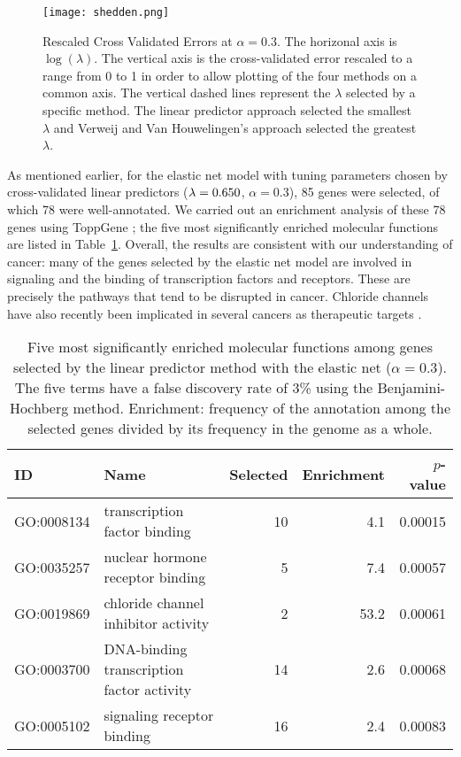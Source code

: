 \begin{figure}[!htb]
  \centering
  \texttt{[image: shedden.png]}
  \caption{\label{fig:CVE}Rescaled Cross Validated Errors at $\alpha = 0.3$. The horizonal axis is $\log(\lambda)$. The vertical axis is the cross-validated error rescaled to a range from 0 to 1 in order to allow plotting of the four methods on a common axis. The vertical dashed lines represent the $\lambda$ selected by a specific method. The linear predictor approach selected the smallest $\lambda$ and Verweij and Van Houwelingen's approach selected the greatest $\lambda$.}
\end{figure}

As mentioned earlier, for the elastic net model with tuning parameters chosen by cross-validated linear predictors ($\lambda = 0.650$, $\alpha = 0.3$), 85 genes were selected, of which 78 were well-annotated.  We carried out an enrichment analysis of these 78 genes using ToppGene \citep{Chen2009c}; the five most significantly enriched molecular functions are listed in Table~\ref{Tab:go}.  Overall, the results are consistent with our understanding of cancer: many of the genes selected by the elastic net model are involved in signaling and the binding of transcription factors and receptors.  These are precisely the pathways that tend to be disrupted in cancer.  Chloride channels have also recently been implicated in several cancers as therapeutic targets \citep{Peretti2015}.

\begin{table}[ht]
\centering
\caption{\label{Tab:go} Five most significantly enriched molecular functions among genes selected by the linear predictor method with the elastic net ($\alpha=0.3$).  The five terms have a false discovery rate of 3\% using the Benjamini-Hochberg method. Enrichment: frequency of the annotation among the selected genes divided by its frequency in the genome as a whole.}
\begin{tabular}{llrrr}
\toprule
ID & Name & Selected & Enrichment & $p$-value \\
\midrule
GO:0008134 & transcription factor binding & 10 & 4.1 & 0.00015 \\
GO:0035257 & nuclear hormone receptor binding & 5 & 7.4 & 0.00057 \\
GO:0019869 & chloride channel inhibitor activity & 2 & 53.2 & 0.00061 \\
GO:0003700 & DNA-binding transcription factor activity & 14 & 2.6 & 0.00068 \\
GO:0005102 & signaling receptor binding & 16 & 2.4 & 0.00083 \\
\bottomrule
\end{tabular}
\end{table}

